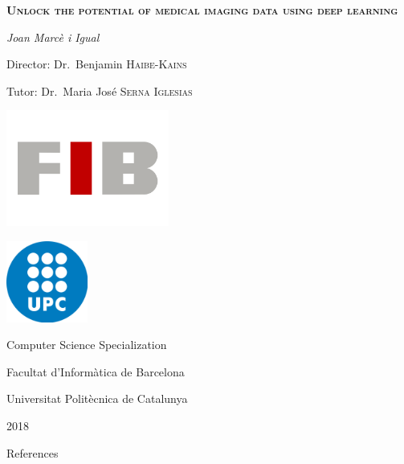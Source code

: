 \documentclass[a4paper, 12pt]{article}
\newcommand{\secc}{
  \ifdef{\chapter}{
    \chapter
  }{
    \section
  }
}
\begin{document}
\begin{titlepage}
  \centering
  \vspace{1.5cm}
  {\huge \textbf{\textsc{Unlock the potential of medical imaging data using deep learning}} \par}
  \vspace{2cm}
  {\Large \textit{Joan Marcè i Igual}\par}
  \vfill
  {Director: Dr.~Benjamin \textsc{Haibe-Kains} \par}
  {Tutor: Dr.~Maria José \textsc{Serna Iglesias} \par}
  
  \vfill

  \includegraphics[width=0.4\textwidth]{images/logo_FIB}\par
  
  \vspace{.5cm}
  
  \includegraphics[width=0.2\textwidth]{images/logo_upc}\par
  
  \vfill
  
  {\Large Computer Science Specialization \par}
  {\LARGE Facultat d'Informàtica de Barcelona \par}
  {\LARGE Universitat Politècnica de Catalunya \par}
  {\LARGE 2018 \par}
\end{titlepage}

\tableofcontents
\listoffigures
\listoftables

\pagebreak





\pagebreak
\secc{References}
\printbibliography[heading=none]{}
\end{document}
